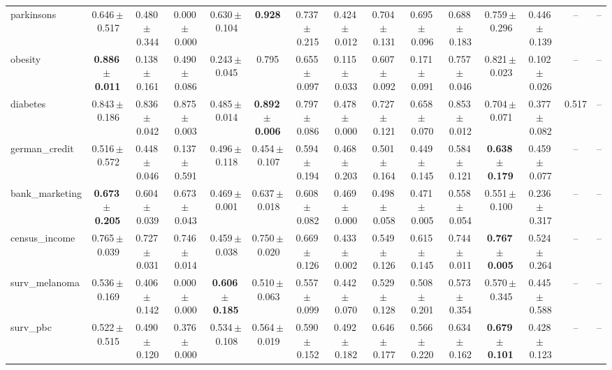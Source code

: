 \documentclass[8pt]{extarticle}
\begin{document}
\begin{longtable}{l*{14}{c}}
parkinsons & 0.646\,$\pm$\,0.517 & 0.480\,$\pm$\,0.344 & 0.000\,$\pm$\,0.000 & 0.630\,$\pm$\,0.104 & \textbf{0.928} & 0.737\,$\pm$\,0.215 & 0.424\,$\pm$\,0.012 & 0.704\,$\pm$\,0.131 & 0.695\,$\pm$\,0.096 & 0.688\,$\pm$\,0.183 & 0.759\,$\pm$\,0.296 & 0.446\,$\pm$\,0.139 & -- & -- \\
obesity & \textbf{0.886\,$\pm$\,0.011} & 0.138\,$\pm$\,0.161 & 0.490\,$\pm$\,0.086 & 0.243\,$\pm$\,0.045 & 0.795 & 0.655\,$\pm$\,0.097 & 0.115\,$\pm$\,0.033 & 0.607\,$\pm$\,0.092 & 0.171\,$\pm$\,0.091 & 0.757\,$\pm$\,0.046 & 0.821\,$\pm$\,0.023 & 0.102\,$\pm$\,0.026 & -- & -- \\
diabetes & 0.843\,$\pm$\,0.186 & 0.836\,$\pm$\,0.042 & 0.875\,$\pm$\,0.003 & 0.485\,$\pm$\,0.014 & \textbf{0.892\,$\pm$\,0.006} & 0.797\,$\pm$\,0.086 & 0.478\,$\pm$\,0.000 & 0.727\,$\pm$\,0.121 & 0.658\,$\pm$\,0.070 & 0.853\,$\pm$\,0.012 & 0.704\,$\pm$\,0.071 & 0.377\,$\pm$\,0.082 & 0.517 & -- \\
german\_credit & 0.516\,$\pm$\,0.572 & 0.448\,$\pm$\,0.046 & 0.137\,$\pm$\,0.591 & 0.496\,$\pm$\,0.118 & 0.454\,$\pm$\,0.107 & 0.594\,$\pm$\,0.194 & 0.468\,$\pm$\,0.203 & 0.501\,$\pm$\,0.164 & 0.449\,$\pm$\,0.145 & 0.584\,$\pm$\,0.121 & \textbf{0.638\,$\pm$\,0.179} & 0.459\,$\pm$\,0.077 & -- & -- \\
bank\_marketing & \textbf{0.673\,$\pm$\,0.205} & 0.604\,$\pm$\,0.039 & 0.673\,$\pm$\,0.043 & 0.469\,$\pm$\,0.001 & 0.637\,$\pm$\,0.018 & 0.608\,$\pm$\,0.082 & 0.469\,$\pm$\,0.000 & 0.498\,$\pm$\,0.058 & 0.471\,$\pm$\,0.005 & 0.558\,$\pm$\,0.054 & 0.551\,$\pm$\,0.100 & 0.236\,$\pm$\,0.317 & -- & -- \\
census\_income & 0.765\,$\pm$\,0.039 & 0.727\,$\pm$\,0.031 & 0.746\,$\pm$\,0.014 & 0.459\,$\pm$\,0.038 & 0.750\,$\pm$\,0.020 & 0.669\,$\pm$\,0.126 & 0.433\,$\pm$\,0.002 & 0.549\,$\pm$\,0.126 & 0.615\,$\pm$\,0.145 & 0.744\,$\pm$\,0.011 & \textbf{0.767\,$\pm$\,0.005} & 0.524\,$\pm$\,0.264 & -- & -- \\
surv\_melanoma & 0.536\,$\pm$\,0.169 & 0.406\,$\pm$\,0.142 & 0.000\,$\pm$\,0.000 & \textbf{0.606\,$\pm$\,0.185} & 0.510\,$\pm$\,0.063 & 0.557\,$\pm$\,0.099 & 0.442\,$\pm$\,0.070 & 0.529\,$\pm$\,0.128 & 0.508\,$\pm$\,0.201 & 0.573\,$\pm$\,0.354 & 0.570\,$\pm$\,0.345 & 0.445\,$\pm$\,0.588 & -- & -- \\
surv\_pbc & 0.522\,$\pm$\,0.515 & 0.490\,$\pm$\,0.120 & 0.376\,$\pm$\,0.000 & 0.534\,$\pm$\,0.108 & 0.564\,$\pm$\,0.019 & 0.590\,$\pm$\,0.152 & 0.492\,$\pm$\,0.182 & 0.646\,$\pm$\,0.177 & 0.566\,$\pm$\,0.220 & 0.634\,$\pm$\,0.162 & \textbf{0.679\,$\pm$\,0.101} & 0.428\,$\pm$\,0.123 & -- & -- \\

\end{longtable}
\end{document}
